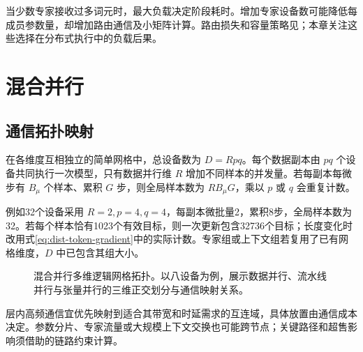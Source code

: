 \documentclass[../textbook.tex]{subfiles}
\begin{document}
当少数专家接收过多词元时，最大负载决定阶段耗时。增加专家设备数可能降低每成员参数量，却增加路由通信及小矩阵计算。路由损失和容量策略见；本章关注这些选择在分布式执行中的负载后果。

\section{混合并行}

\subsection{通信拓扑映射}
在各维度互相独立的简单网格中，总设备数为 $D=Rpq$。每个数据副本由 $pq$ 个设备共同执行一次模型，只有数据并行维 $R$ 增加不同样本的并发量。若每副本每微步有 $B_\mu$ 个样本、累积 $G$ 步，则全局样本数为 $RB_\mu G$，乘以 $p$ 或 $q$ 会重复计数。

例如32个设备采用 $R=2,p=4,q=4$，每副本微批量2，累积8步，全局样本数为32。若每个样本恰有1023个有效目标，则一次更新包含32736个目标；长度变化时改用式\eqref{eq:dist-token-gradient}中的实际计数。专家组或上下文组若复用了已有网格维度，$D$ 中已包含其组大小。

\begin{figure}[htbp]
\centering
{}
\caption[混合并行多维逻辑网格拓扑]{混合并行多维逻辑网格拓扑。以八设备为例，展示数据并行、流水线并行与张量并行的三维正交划分与通信映射关系。}\label{fig:dist-grid}
\end{figure}

层内高频通信宜优先映射到适合其带宽和时延需求的互连域，具体放置由通信成本决定。参数分片、专家流量或大规模上下文交换也可能跨节点；关键路径和超售影响须借助的链路约束计算。
\end{document}

